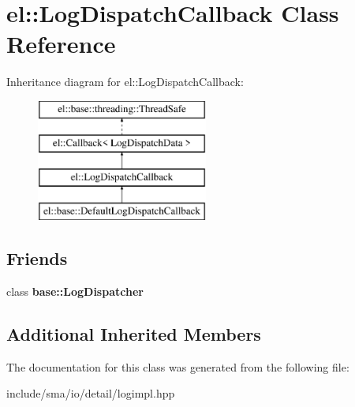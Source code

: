 \hypertarget{classel_1_1LogDispatchCallback}{\section{el\-:\-:Log\-Dispatch\-Callback Class Reference}
\label{classel_1_1LogDispatchCallback}
}
Inheritance diagram for el\-:\-:Log\-Dispatch\-Callback\-:\begin{figure}[H]
\begin{center}
\leavevmode
\includegraphics[height=4.000000cm]{classel_1_1LogDispatchCallback}
\end{center}
\end{figure}
\subsection*{Friends}
\begin{DoxyCompactItemize}
\item 
\hypertarget{classel_1_1LogDispatchCallback_a84d22f9ad5b796e49ff5f15a8c32773d}{class {\bfseries base\-::\-Log\-Dispatcher}}\label{classel_1_1LogDispatchCallback_a84d22f9ad5b796e49ff5f15a8c32773d}

\end{DoxyCompactItemize}
\subsection*{Additional Inherited Members}


The documentation for this class was generated from the following file\-:\begin{DoxyCompactItemize}
\item 
include/sma/io/detail/logimpl.\-hpp\end{DoxyCompactItemize}
